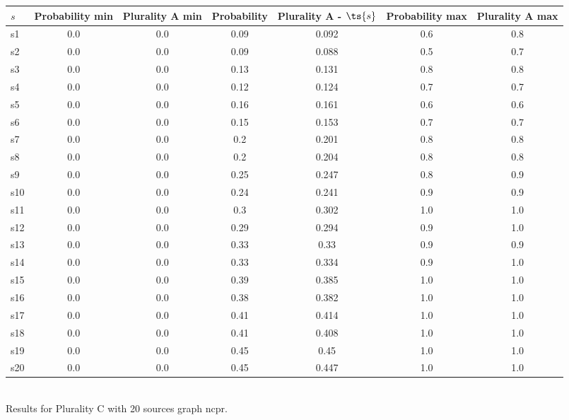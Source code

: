 \documentclass{article}
\begin{document}
\noindent\begin{tabular}{|l|c|c|c|c|c|c|}
\hline
$s$& Probability min & Plurality A min & Probability & Plurality A - $\ts{s}$ & Probability max & Plurality A max\\
\hline
s1 &0.0 & 0.0 & 0.09 & 0.092 & 0.6 & 0.8\\
\hline
s2 &0.0 & 0.0 & 0.09 & 0.088 & 0.5 & 0.7\\
\hline
s3 &0.0 & 0.0 & 0.13 & 0.131 & 0.8 & 0.8\\
\hline
s4 &0.0 & 0.0 & 0.12 & 0.124 & 0.7 & 0.7\\
\hline
s5 &0.0 & 0.0 & 0.16 & 0.161 & 0.6 & 0.6\\
\hline
s6 &0.0 & 0.0 & 0.15 & 0.153 & 0.7 & 0.7\\
\hline
s7 &0.0 & 0.0 & 0.2 & 0.201 & 0.8 & 0.8\\
\hline
s8 &0.0 & 0.0 & 0.2 & 0.204 & 0.8 & 0.8\\
\hline
s9 &0.0 & 0.0 & 0.25 & 0.247 & 0.8 & 0.9\\
\hline
s10 &0.0 & 0.0 & 0.24 & 0.241 & 0.9 & 0.9\\
\hline
s11 &0.0 & 0.0 & 0.3 & 0.302 & 1.0 & 1.0\\
\hline
s12 &0.0 & 0.0 & 0.29 & 0.294 & 0.9 & 1.0\\
\hline
s13 &0.0 & 0.0 & 0.33 & 0.33 & 0.9 & 0.9\\
\hline
s14 &0.0 & 0.0 & 0.33 & 0.334 & 0.9 & 1.0\\
\hline
s15 &0.0 & 0.0 & 0.39 & 0.385 & 1.0 & 1.0\\
\hline
s16 &0.0 & 0.0 & 0.38 & 0.382 & 1.0 & 1.0\\
\hline
s17 &0.0 & 0.0 & 0.41 & 0.414 & 1.0 & 1.0\\
\hline
s18 &0.0 & 0.0 & 0.41 & 0.408 & 1.0 & 1.0\\
\hline
s19 &0.0 & 0.0 & 0.45 & 0.45 & 1.0 & 1.0\\
\hline
s20 &0.0 & 0.0 & 0.45 & 0.447 & 1.0 & 1.0\\
\hline
\end{tabular}\\

\noindent Results for Plurality C with 20 sources graph ncpr.
\end{document}
